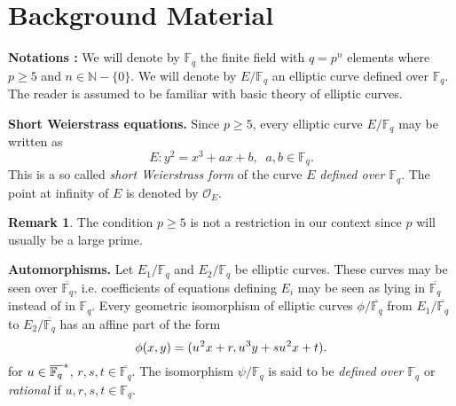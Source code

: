 \documentclass[10pt]{article}
\theoremstyle{definition}
\newtheorem{remark}{Remark}
\newcommand{\N}{\mathbb{N}}
\newcommand{\F}{\mathbb{F}}
\begin{document}
\section{Background Material}

\textbf{Notations :}
We will denote by $\F_q$ the finite field with $q = p^n$ elements where $p \geq 5$ and $n \in \N - \lbrace 0 \rbrace$.
We will denote by $E/\F_q$ an elliptic curve defined over $\F_q$. 
The reader is assumed to be familiar with basic theory of elliptic curves.

\vspace*{.1cm}
\noindent \textbf{Short Weierstrass equations.}  Since $p\geq 5$, every elliptic curve $E/\F_q$ may be written as
\[ E : y^2 = x^3 + ax + b, \; \; a,b \in \F_q. \]
This is a so called \textsl{short Weierstrass form} of the curve $E$ \textsl{defined over $\F_q$}.
The point at infinity of $E$ is denoted by $\mathcal{O}_E$.

\noindent \begin{remark} 
The condition $p \geq 5$ is not a restriction in our context since $p$ will usually be a large prime.
\end{remark}

\noindent \textbf{Automorphisms.} Let $E_1/\F_q$ and $E_2/\F_q$ be elliptic curves. 
These curves may be seen over $\overline{\F_q}$, i.e. coefficients of equations defining $E_i$ may be seen as lying in $\overline{\F_q}$ instead of in $\F_q$.
Every geometric isomorphism of elliptic curves $\phi/\overline{\F_q}$
from $E_1/\overline{\F_q}$ to $E_2/\overline{\F_q}$ has an  affine part of the form 
\begin{equation}\label{morphism}
 \phi(x,y) = (u^{\mkern1mu 2}x + r, u^{\mkern1mu 3}y + su^{\mkern1mu 2}x + t).
\end{equation}
for $u \in \overline{\F_q}^{\mkern1mu *}$, $r,s,t \in \overline{\F_q}$.
The isomorphism $\psi/\F_q$ is said to be \textsl{defined over $\F_q$} or \textsl{rational} if $u,r,s,t \in \F_q$.
\end{document}

